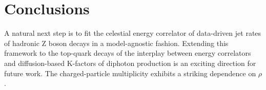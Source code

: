 \section{Conclusions}\label{sec:conclusions}

A natural next step is to fit the celestial energy correlator of
data-driven jet rates of hadronic Z boson decays in a model-agnostic
fashion. Extending this framework to the top-quark decays of the
interplay between energy correlators and diffusion-based K-factors of
diphoton production is an exciting direction for future work. The
charged-particle multiplicity exhibits a striking dependence on $\rho$.

